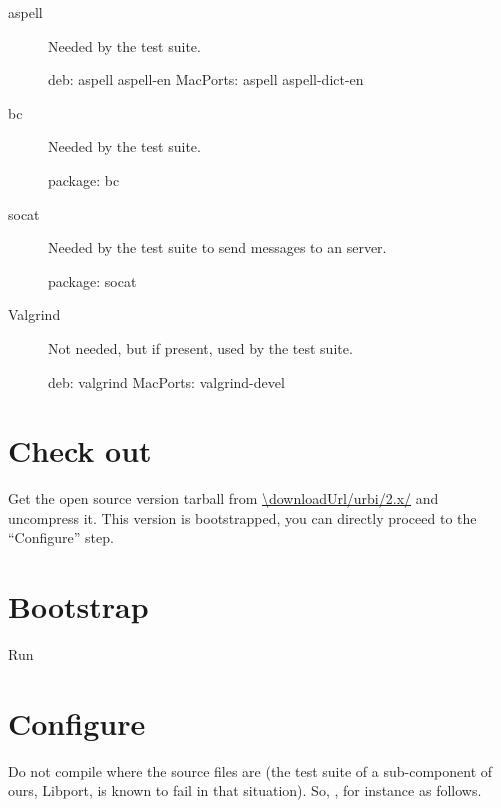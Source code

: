 \begin{description}
\item[aspell] Needed by the test suite.
\begin{package}
deb: aspell aspell-en
MacPorts: aspell aspell-dict-en
\end{package}

\item[bc]
  Needed by the test suite.
\begin{package}
package: bc
\end{package}

\item[socat] Needed by the test suite to send messages to an \urbi server.
\begin{package}
package: socat
\end{package}

\item[Valgrind] Not needed, but if present, used by the test suite.
\begin{package}
deb: valgrind
MacPorts: valgrind-devel
\end{package}

\end{description}



\section{Check out}

Get the open source version tarball from \url{\downloadUrl/urbi/2.x/} and
uncompress it.  This version is bootstrapped, you can directly proceed to
the ``Configure'' step.

\section{Bootstrap}
Run


\section{Configure}
\label{sec:build:configure}

Do not compile where the source files are (the test suite of a sub-component
of ours, Libport, is known to fail in that situation).  So, , for instance as
follows.

